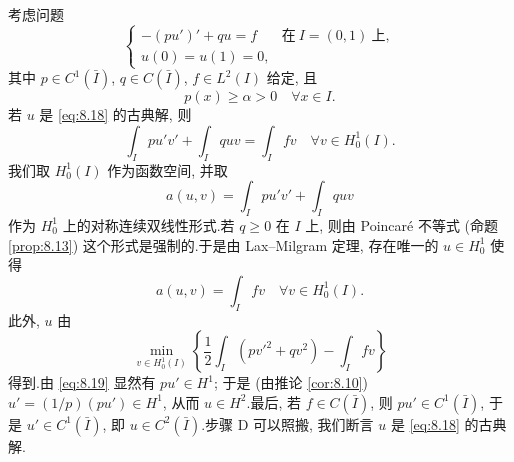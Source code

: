 \begin{starexample}
\label{ex:8.2}
考虑问题
\begin{equation}
\begin{cases}
-(pu')'+qu=f & \text{在}\ I=(0,1)\ \text{上},\\
u(0)=u(1)=0,
\end{cases}
\label{eq:8.18}
\end{equation}
其中 $p\in C^1(\bar I)$, $q\in C(\bar I)$, $f\in L^2(I)$ 给定, 且
\begin{equation*}
p(x)\ge\alpha>0\quad\forall x\in I.
\end{equation*}
若 $u$ 是 \eqref{eq:8.18} 的古典解, 则
\begin{equation*}
\int_I pu'v'+\int_I quv=\int_I fv\quad\forall v\in H_0^1(I).
\end{equation*}
我们取 $H_0^1(I)$ 作为函数空间, 并取
\begin{equation*}
a(u,v)=\int_I pu'v'+\int_I quv
\end{equation*}
作为 $H_0^1$ 上的对称连续双线性形式.若 $q\ge0$ 在 $I$ 上, 则由 Poincaré
不等式 (命题  \ref{prop:8.13}) 这个形式是强制的.于是由 Lax--Milgram 定理,
存在唯一的 $u\in H_0^1$ 使得
\begin{equation}
a(u,v)=\int_I fv\quad\forall v\in H_0^1(I).
\label{eq:8.19}
\end{equation}
此外, $u$ 由
\begin{equation*}
\min_{v\in H_0^1(I)}\left\{\frac12\int_I(pv'^2+qv^2)-\int_I fv\right\}
\end{equation*}
得到.由 \eqref{eq:8.19} 显然有 $pu'\in H^1$; 于是 (由推论  \ref{cor:8.10})
$u'=(1/p)(pu')\in H^1$, 从而 $u\in H^2$.最后, 若 $f\in C(\bar I)$, 则
$pu'\in C^1(\bar I)$, 于是 $u'\in C^1(\bar I)$, 即 $u\in C^2(\bar I)$.步骤 D
可以照搬, 我们断言 $u$ 是 \eqref{eq:8.18} 的古典解.


\end{starexample}
